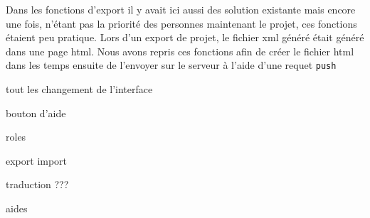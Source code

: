 Dans les fonctions d'export il y avait ici aussi des solution existante mais encore une fois, n'étant pas la priorité des personnes maintenant le projet, ces fonctions étaient peu pratique. Lors d'un export de projet, le fichier xml généré était généré dans une page html. Nous avons repris ces fonctions afin de créer le fichier html dans les temps ensuite de l'envoyer sur le serveur à l'aide d'une requet \texttt{push}

tout les changement de l'interface

bouton d'aide

roles

export import

traduction ???

aides
